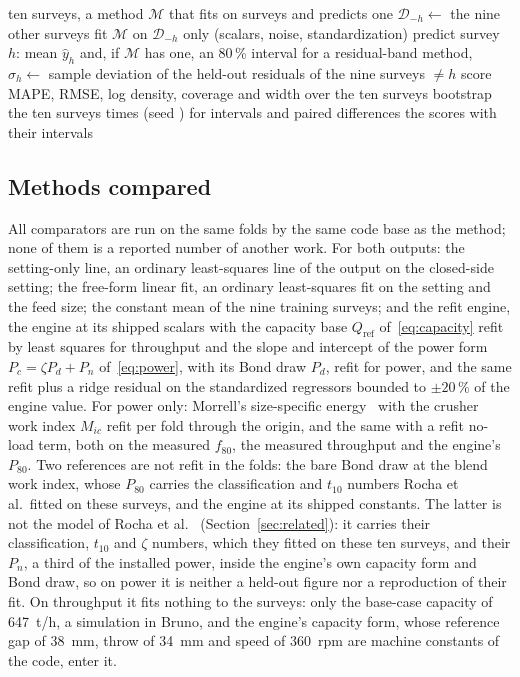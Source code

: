 \documentclass[journal]{IEEEtran}
\newcommand{\pct}{\,\%}
\begin{document}
\begin{algorithm}[!t]
\caption{Strict leave-one-survey-out protocol, shared by every method}
\label{alg:loso}
\begin{algorithmic}[1]
\Require ten surveys, a method $\mathcal M$ that fits on surveys and predicts one
  \State $\mathcal D_{-h}\gets$ the nine other surveys
  \State fit $\mathcal M$ on $\mathcal D_{-h}$ only (scalars, noise, standardization)
  \State predict survey $h$: mean $\hat y_h$ and, if $\mathcal M$ has one, an 80\pct{} interval
\EndFor
\State for a residual-band method, $\sigma_h\gets$ sample deviation of the held-out residuals of the nine surveys $\neq h$
\State score MAPE, RMSE, log density, coverage and width over the ten surveys
\State bootstrap the ten surveys \nBoot{} times (seed \bootSeed) for intervals and paired differences
\State \Return the scores with their intervals
\end{algorithmic}
\end{algorithm}

\subsection{Methods compared}

All comparators are run on the same folds by the same code base as the method; none of them is a reported number of
another work. For both outputs: the setting-only line, an ordinary least-squares line of the output on the closed-side
setting; the free-form linear fit, an ordinary least-squares fit on the setting and the feed size; the constant mean of the
nine training surveys; and the refit engine, the engine at its shipped scalars with the capacity base $Q_{\mathrm{ref}}$
of~\eqref{eq:capacity} refit by least squares for throughput and the slope and intercept of the power form
$P_c=\zeta P_d+P_n$ of~\eqref{eq:power}, with its Bond draw $P_d$, refit for power, and the same refit plus a ridge residual
on the standardized regressors bounded to $\pm20$\pct{} of the engine value. For power only: Morrell's size-specific
energy~\cite{morrell,gmsg} with the crusher work index $M_{ic}$ refit per fold through the origin, and the same with a
refit no-load term, both on the measured $f_{80}$, the measured throughput and the engine's $P_{80}$. Two references are not refit in the folds: the bare Bond draw at the blend work index, whose $P_{80}$ carries the
classification and $t_{10}$ numbers Rocha et al.\ fitted on these surveys, and the engine at its shipped constants. The latter is
not the model of Rocha et al.~\cite{rocha} (Section~\ref{sec:related}): it carries their classification, $t_{10}$ and
$\zeta$ numbers, which they fitted on these ten surveys, and their $P_n$, a third of the installed power, inside the
engine's own capacity form and Bond draw, so on power it is neither a held-out figure nor a reproduction of their fit. On throughput it fits nothing to the surveys: only the
base-case capacity of 647~t/h, a simulation in Bruno, and the engine's capacity form, whose reference gap of 38~mm, throw
of 34~mm and speed of 360~rpm are machine constants of the code, enter it.
\end{document}
